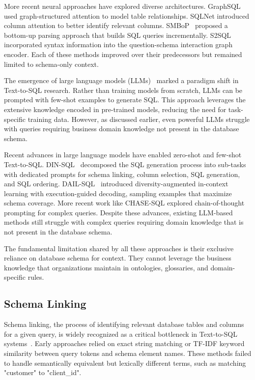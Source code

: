 \documentclass[sigconf, nonatbib]{acmart}
\begin{document}
More recent neural approaches have explored diverse architectures. GraphSQL used graph-structured attention to model table relationships. SQLNet introduced column attention to better identify relevant columns. SMBoP~\cite{lin2020bridging} proposed a bottom-up parsing approach that builds SQL queries incrementally. S2SQL~\cite{hui2022s2sql} incorporated syntax information into the question-schema interaction graph encoder. Each of these methods improved over their predecessors but remained limited to schema-only context.

The emergence of large language models (LLMs)~\cite{brown2020language,openai2023gpt4,touvron2023llama} marked a paradigm shift in Text-to-SQL research. Rather than training models from scratch, LLMs can be prompted with few-shot examples to generate SQL. This approach leverages the extensive knowledge encoded in pre-trained models, reducing the need for task-specific training data. However, as discussed earlier, even powerful LLMs struggle with queries requiring business domain knowledge not present in the database schema.

Recent advances in large language models have enabled zero-shot and few-shot Text-to-SQL. DIN-SQL~\cite{pourreza2023din} decomposed the SQL generation process into sub-tasks with dedicated prompts for schema linking, column selection, SQL generation, and SQL ordering. DAIL-SQL~\cite{gao2023dail} introduced diversity-augmented in-context learning with execution-guided decoding, sampling examples that maximize schema coverage. More recent work like CHASE-SQL explored chain-of-thought prompting for complex queries. Despite these advances, existing LLM-based methods still struggle with complex queries requiring domain knowledge that is not present in the database schema.

The fundamental limitation shared by all these approaches is their exclusive reliance on database schema for context. They cannot leverage the business knowledge that organizations maintain in ontologies, glossaries, and domain-specific rules.

\subsection{Schema Linking}

Schema linking, the process of identifying relevant database tables and columns for a given query, is widely recognized as a critical bottleneck in Text-to-SQL systems~\cite{lei2020schema}. Early approaches relied on exact string matching or TF-IDF keyword similarity between query tokens and schema element names. These methods failed to handle semantically equivalent but lexically different terms, such as matching "customer" to "client\_id".
\end{document}
